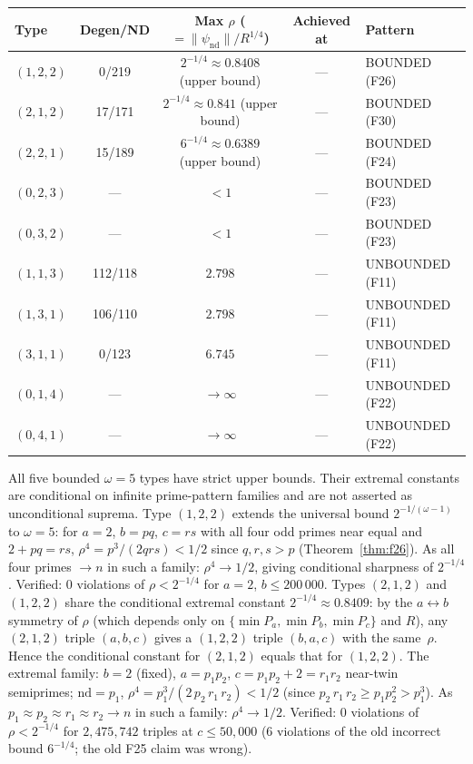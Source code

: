 \documentclass[12pt]{article}
\theoremstyle{definition}
\begin{document}
\begin{center}
\small\begin{tabular}{lcccl}
\hline
Type & Degen/ND & Max $\rho$ ($= \|\psi_\mathrm{nd}\|/R^{1/4}$) & Achieved at & Pattern \\
\hline
$(1,2,2)$ & 0/219 & $2^{-1/4}{\approx}0.8408$ (upper bound) & --- & BOUNDED (F26) \\
$(2,1,2)$ & 17/171 & $2^{-1/4}{\approx}0.841$ (upper bound) & --- & BOUNDED (F30) \\
$(2,2,1)$ & 15/189 & $6^{-1/4}{\approx}0.6389$ (upper bound) & --- & BOUNDED (F24) \\
$(0,2,3)$ & ---    & $< 1$ & --- & BOUNDED (F23) \\
$(0,3,2)$ & ---    & $< 1$ & --- & BOUNDED (F23) \\
$(1,1,3)$ & 112/118 & $2.798$ & --- & UNBOUNDED (F11) \\
$(1,3,1)$ & 106/110 & $2.798$ & --- & UNBOUNDED (F11) \\
$(3,1,1)$ & 0/123 & $6.745$ & --- & UNBOUNDED (F11) \\
$(0,1,4)$ & ---    & $\to\infty$ & --- & UNBOUNDED (F22) \\
$(0,4,1)$ & ---    & $\to\infty$ & --- & UNBOUNDED (F22) \\
\hline
\end{tabular}
\end{center}

\noindent
All five bounded $\omega=5$ types have strict upper bounds.  Their extremal
constants are conditional on infinite prime-pattern families and are not
asserted as unconditional suprema.
Type $(1,2,2)$ extends the universal bound $2^{-1/(\omega-1)}$ to $\omega=5$:
for $a=2$, $b=pq$, $c=rs$ with all four odd primes near equal and $2+pq=rs$,
$\rho^4 = p^3/(2qrs) < 1/2$ since $q,r,s > p$ (Theorem~\ref{thm:f26}).
As all four primes $\to n$ in such a family: $\rho^4 \to 1/2$, giving
conditional sharpness of $2^{-1/4}$.
Verified: 0 violations of $\rho < 2^{-1/4}$ for $a=2$, $b \le 200\,000$.
Types $(2,1,2)$ and $(1,2,2)$ share the conditional extremal constant
$2^{-1/4} \approx 0.8409$: by the $a \leftrightarrow b$
symmetry of $\rho$ (which depends only on $\{\min P_a,\min P_b,\min P_c\}$ and $R$),
any $(2,1,2)$ triple $(a,b,c)$ gives a $(1,2,2)$ triple $(b,a,c)$ with the same~$\rho$.
Hence the conditional constant for $(2,1,2)$ equals that for $(1,2,2)$.
The extremal family: $b=2$ (fixed), $a=p_1 p_2$, $c=p_1 p_2+2=r_1 r_2$ near-twin semiprimes;
$\mathrm{nd}=p_1$, $\rho^4 = p_1^3/(2\,p_2\,r_1\,r_2) < 1/2$ (since $p_2\,r_1\,r_2 \ge p_1 p_2^2 > p_1^3$).
As $p_1{\approx}p_2{\approx}r_1{\approx}r_2{\to}n$ in such a family:
$\rho^4 \to 1/2$.
Verified: 0 violations of $\rho < 2^{-1/4}$ for $2{,}475{,}742$ triples at $c \le 50{,}000$
(6 violations of the old incorrect bound $6^{-1/4}$; the old F25 claim was wrong).
\end{document}
